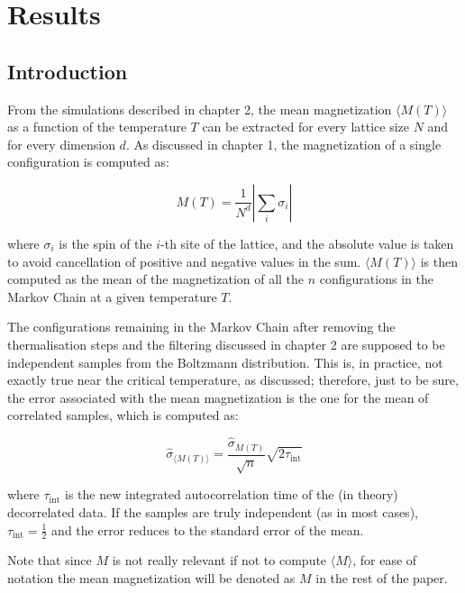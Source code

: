 \chapter{Results}

\section{Introduction}

From the simulations described in chapter 2, the mean magnetization $\langle M(T) \rangle$ as a function of the temperature $T$ can be extracted for every lattice size $N$ and for every dimension $d$. As discussed in chapter 1, the magnetization of a single configuration is computed as:

\begin{equation}
	M(T) = \frac{1}{N^d} \left| \sum_i \sigma_i \right|
\end{equation}

where $\sigma_i$ is the spin of the $i$-th site of the lattice, and the absolute value is taken to avoid cancellation of positive and negative values in the sum. $\langle M(T) \rangle$ is then computed as the mean of the magnetization of all the $n$ configurations in the Markov Chain at a given temperature $T$.

The configurations remaining in the Markov Chain after removing the thermalisation steps and the filtering discussed in chapter 2 are supposed to be independent samples from the Boltzmann distribution. This is, in practice, not exactly true near the critical temperature, as discussed; therefore, just to be sure, the error associated with the mean magnetization is the one for the mean of correlated samples, which is computed as:

\begin{equation}
	\hat{\sigma}_{\langle M(T) \rangle} =\frac{\hat{\sigma}_{M(T)}}{\sqrt{n}} \sqrt{2 \tau_{\text{int}}} 
\end{equation}

where $\tau_{\text{int}}$ is the new integrated autocorrelation time of the (in theory) decorrelated data. If the samples are truly independent (as in most cases), $\tau_{\text{int}} = \frac{1}{2}$ and the error reduces to the standard error of the mean.

Note that since $M$ is not really relevant if not to compute $\langle M \rangle$, for ease of notation the mean magnetization will be denoted as $M$ in the rest of the paper.

\br

